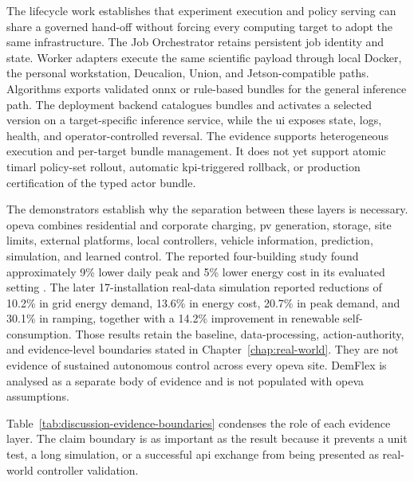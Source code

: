 The lifecycle work establishes that experiment execution and policy serving can share a governed hand-off without forcing every computing target to adopt the same infrastructure. The Job Orchestrator retains persistent job identity and state. Worker adapters execute the same scientific payload through local Docker, the personal workstation, Deucalion, Union, and Jetson-compatible paths. Algorithms exports validated \gls{onnx} or rule-based bundles for the general inference path. The deployment backend catalogues bundles and activates a selected version on a target-specific inference service, while the \gls{ui} exposes state, logs, health, and operator-controlled reversal. The evidence supports heterogeneous execution and per-target bundle management. It does not yet support atomic \gls{timarl} policy-set rollout, automatic \gls{kpi}-triggered rollback, or production certification of the typed actor bundle.

The demonstrators establish why the separation between these layers is necessary. \gls{opeva} combines residential and corporate charging, \gls{pv} generation, storage, site limits, external platforms, local controllers, vehicle information, prediction, simulation, and learned control. The reported four-building study found approximately 9\% lower daily peak and 5\% lower energy cost in its evaluated setting \parencite{fonseca2025realworldrec}. The later 17-installation real-data simulation reported reductions of 10.2\% in grid energy demand, 13.6\% in energy cost, 20.7\% in peak demand, and 30.1\% in ramping, together with a 14.2\% improvement in renewable self-consumption. Those results retain the baseline, data-processing, action-authority, and evidence-level boundaries stated in Chapter~\ref{chap:real-world}. They are not evidence of sustained autonomous control across every \gls{opeva} site. DemFlex is analysed as a separate body of evidence and is not populated with \gls{opeva} assumptions.

Table~\ref{tab:discussion-evidence-boundaries} condenses the role of each evidence layer. The claim boundary is as important as the result because it prevents a unit test, a long simulation, or a successful \gls{api} exchange from being presented as real-world controller validation.

